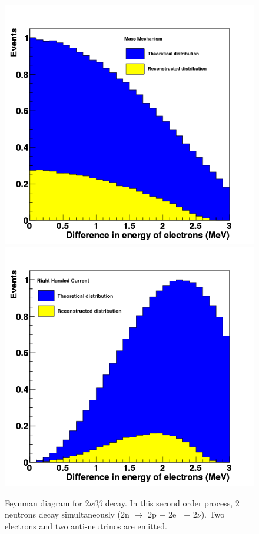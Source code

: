 \documentclass[main.tex]{subfiles}
\begin{document}
\begin{figure}[h!]
\begin{center}
\includegraphics[scale=0.3]{pictures/Chap2/MMenergy.png}
\includegraphics[scale=0.3]{pictures/Chap2/RHCenergy.png}
\caption{Feynman diagram for 2$\nu\beta\beta$ decay. In this second order process, 2 neutrons decay simultaneously (2n $\rightarrow$ 2p + 2e$^-$ + 2$\bar{\nu}$). Two electrons and two anti-neutrinos are emitted.}
\label{TopologyDifferenceNMM-RHC}
\end{center}
\end{figure}
\end{document}
